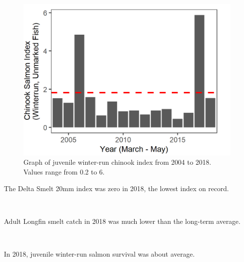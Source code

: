 \documentclass[
]{book}
\begin{document}
\begin{panel-grid}
\begin{columns-nocenter}
\begin{column800}
\begin{expand}
\begin{figure}
\includegraphics[width=15.25in]{figures/DJFMP_chinook_winterByLength_recyears} \caption{Graph of juvenile winter-run chinook index from 2004 to 2018. Values range from 0.2 to 6.}\label{fig:unnamed-chunk-45}
\end{figure}

\end{expand}

\end{column800}

\end{columns-nocenter}

\begin{columns-nocenter}

\begin{column800}

The Delta Smelt 20mm index was zero in 2018, the lowest index on record.

\end{column800}

\begin{column40}

~

\end{column40}

\begin{column800}

Adult Longfin smelt catch in 2018 was much lower than the long-term average.

\end{column800}

\begin{column40}

~

\end{column40}

\begin{column800}

In 2018, juvenile winter-run salmon survival was about average.

\end{column800}

\end{columns-nocenter}

\end{panel-grid}
\end{document}
